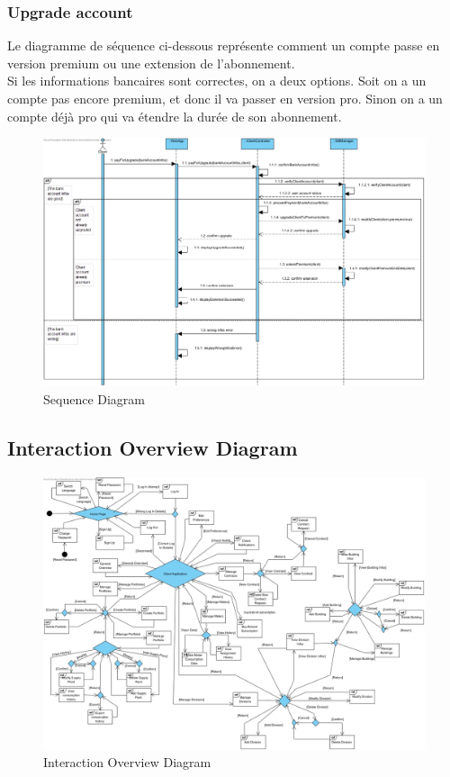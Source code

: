 \documentclass{report}
\begin{document}
\subsubsection{Upgrade account}
Le diagramme de séquence ci-dessous représente comment un compte passe en version premium ou une extension de l'abonnement. \\
Si les informations bancaires sont correctes, on a deux options. Soit on a un compte pas encore premium, et donc il va passer en version pro. Sinon on a un compte déjà pro qui va étendre la durée de son abonnement.\\
\begin{figure}[h]
	\centering
	\includegraphics[width=1.3\textwidth]{upgrade account}
	\caption{Sequence Diagram}
	\label{fig:upgrade}
\end{figure}

\newpage
\subsection{Interaction Overview Diagram}
\begin{figure}[h]
	\centering
	\includegraphics[width=1.3\textwidth]{IOD3}
	\caption{Interaction Overview Diagram}
	\label{fig:usdClient}
\end{figure}
\newpage
\end{document}
